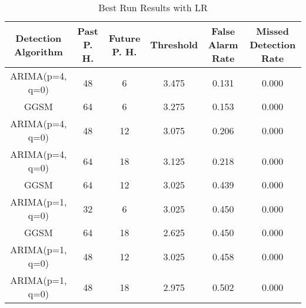 \begin{table*}[h!]
\centering
\caption{Best Run Results with LR}
    \label{table:lrbest}
    \begin{tabular}{|c|c|c|c|c|c|}
        \hline
        Detection Algorithm & Past P. H. & Future P. H. & Threshold & False Alarm Rate & Missed Detection Rate \\
        \hline
        \hline
        ARIMA(p=4, q=0) & 48 & 6 & 3.475 &  0.131 & 0.000 \\
        \hline
        GGSM & 64 & 6 & 3.275 &  0.153 & 0.000 \\
        \hline
        ARIMA(p=4, q=0) & 48 & 12 & 3.075 &  0.206 & 0.000 \\
        \hline
        ARIMA(p=4, q=0) & 64 & 18 & 3.125 &  0.218 & 0.000 \\
        \hline
        GGSM & 64 & 12 & 3.025 &  0.439 & 0.000 \\
        \hline
        ARIMA(p=1, q=0) & 32 & 6 & 3.025 &  0.450 & 0.000 \\
        \hline
        GGSM & 64 & 18 & 2.625 &  0.450 & 0.000 \\
        \hline
        ARIMA(p=1, q=0) & 48 & 12 & 3.025 &  0.458 & 0.000 \\
        \hline
        ARIMA(p=1, q=0) & 48 & 18 & 2.975 &  0.502 & 0.000 \\
        \hline
    \end{tabular}
\end{table*}
